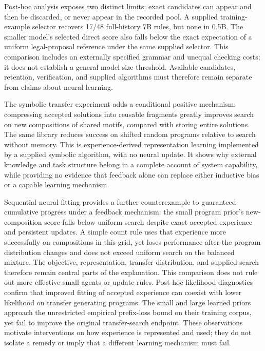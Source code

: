 \documentclass[11pt]{article}
\begin{document}
Post-hoc analysis exposes two distinct limits: exact candidates can appear
and then be discarded, or never appear in the recorded pool. A supplied
training-example selector recovers 17/48 full-history 7B rules, but none in
0.5B. The smaller model's selected direct score also falls below the exact
expectation of a uniform legal-proposal reference under the same supplied
selector. This comparison includes an externally specified grammar and
unequal checking costs; it does not establish a general model-size threshold.
Available candidates, retention, verification, and supplied algorithms must
therefore remain separate from claims about neural learning.

The symbolic transfer experiment adds a conditional positive mechanism:
compressing accepted solutions into reusable fragments greatly improves search
on new compositions of shared motifs, compared with storing entire solutions.
The same library reduces success on shifted random programs relative to
search without memory. This is experience-derived representation learning
implemented by a supplied symbolic algorithm, with no neural update. It shows
why external knowledge and task structure belong in a complete account of
system capability, while providing no evidence that feedback alone can replace
either inductive bias or a capable learning mechanism.

Sequential neural fitting provides a further counterexample to guaranteed
cumulative progress under a feedback mechanism: the small program prior's
new-composition score falls below uniform search despite exact accepted
experience and persistent updates. A simple count rule uses that experience
more successfully on compositions in this grid, yet loses performance after
the program distribution changes and does not exceed uniform search on the
balanced mixture. The objective, representation, transfer distribution, and
supplied search therefore remain central parts of the explanation. This
comparison does not rule out more effective small agents or update rules.
Post-hoc likelihood diagnostics confirm that improved fitting of accepted
experience can coexist with lower likelihood on transfer generating programs.
The small and large learned priors approach the unrestricted empirical
prefix-loss bound on their training corpus, yet fail to improve the original
transfer-search endpoint. These observations motivate interventions on how
experience is represented and used; they do not isolate a remedy or imply
that a different learning mechanism must fail.
\end{document}
